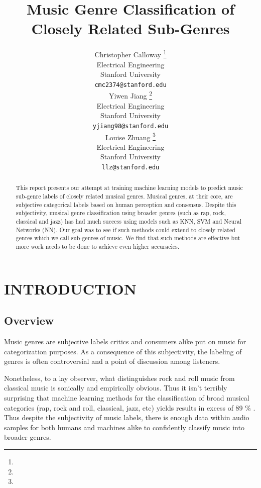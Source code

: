 \documentclass[letterpaper, 12 pt, conference]{ieeeconf}  %
\title{\LARGE \bf
Music Genre Classification of Closely Related Sub-Genres 
}
\author{ \parbox{2 in}{\centering Christopher Calloway
        \thanks{}\\
        Electrical Engineering\\
       Stanford University\\
        {\tt\small cmc2374@stanford.edu}}
        \hspace*{ 0.5 in}
        \parbox{2 in}{ \centering Yiwen Jiang
        \thanks{}\\
        Electrical Engineering \\
        Stanford University\\
        {\tt\small yjiang98@stanford.edu}}
          \hspace*{ 0.5 in}
        \parbox{2 in}{ \centering Louise Zhuang
        \thanks{}\\
        Electrical Engineering \\
        Stanford University\\
        {\tt\small llz@stanford.edu}}
}
\begin{document}
\maketitle
\thispagestyle{empty}
\pagestyle{empty}


\begin{abstract}

This report presents our attempt at training machine learning models to predict music sub-genre labels of closely related musical genres. Musical genres, at their core, are subjective categorical labels based on human perception and consensus. Despite this subjectivity, musical genre classification using broader genres (such as rap, rock, classical and jazz) has had much success using models such as KNN, SVM and Neural Networks (NN). Our goal was to see if such methods could extend to closely related genres  which we call sub-genres of music. We find that such methods are effective but more work needs to be done to achieve even higher accuracies. 




\end{abstract}


\section{INTRODUCTION}

\subsection{Overview}

Music genres are subjective labels critics and consumers alike put on music for categorization purposes. 
As a consequence of this subjectivity, the labeling of genres is often controversial and a point of discussion among listeners. 

Nonetheless, to a lay observer, what distinguishes rock and roll music from classical music is sonically and empirically obvious. Thus it isn't terribly surprising that machine learning methods for the classification of broad musical categories (rap, rock and roll, classical, jazz, etc) yields results in excess of 89 \% \cite{c1} \cite{c2} \cite{c3}. Thus despite the subjectivity of music labels, there is enough data within audio samples for both humans and machines alike to confidently classify music into broader genres.
\end{document}
